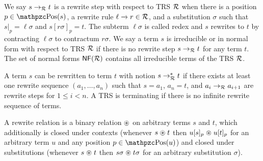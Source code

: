 %
\begin{definition}
	We say $s\rightarrow_{\mathcal R} t$ is a
	{\myem rewrite step}
	 with respect to TRS ${\mathcal R}$
	when there is a position $p \in \pos(s)$,
	a rewrite rule $\ell\xrightarrow[{}]{} r\in{\mathcal R}$,
	and a substitution $\sigma$ such that
	$s|_p=\ell\sigma$ and $s[r\sigma]_p = t$.
		The subterm $\ell\sigma$ is called {\myem redex} and
	$s$ rewrites to $t$ by {\myem contracting} $\ell\sigma$ to {\myem contractum} $r\sigma$.
	We say a term $s$ is {\myem irreducible} or in {\myem normal form} with respect to TRS ${\mathcal R}$ if there is no rewrite step $s\rightarrow_{\mathcal R} t$ for any term $t$.
	The set of normal forms $\mathsf{NF}({\mathcal R})$ contains all irreducible terms of the TRS ${\mathcal R}$.

	\end{definition}
%
%
\begin{definition}
	A term $s$ can be rewritten to term $t$ with notion $s\rightarrow^*_{\mathcal R} t$
	if there exists at least one {\myem rewrite sequence} $(a_1,\ldots ,a_n)$ such that
	$s=a_1$, $a_n=t$, and $a_i\rightarrow_{\mathcal R} a_{i+1}$ are rewrite steps for $1\leq i<n$.
	A TRS is {\myem terminating} if there is no infinite rewrite sequence of terms.
\end{definition}
%
\begin{definition}\label{def:closed-under}
	A {\myem rewrite relation} is a binary relation
	$\mathrel{\circledast}$ on arbitrary terms $s$ and $t$,
	which additionally is {\myem closed under contexts}
	(whenever $s\mathrel{\circledast} t$ then $u[s]_p\mathrel{\circledast} u[t]_p$
	for an arbitrary term $u$ and any position $p\in\pos(u)$)
	and {\myem closed under substitutions}
	(whenever $s\mathrel{\circledast} t$ then $s\sigma\mathrel{\circledast} t\sigma$
	for an arbitrary substitution $\sigma$).
\end{definition}
